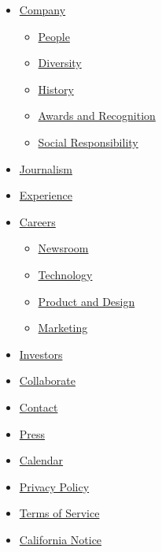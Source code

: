 \begin{itemize}
\tightlist
\item
  \href{https://www.nytco.com/company/}{Company}

  \begin{itemize}
  \tightlist
  \item
    \href{https://www.nytco.com/company/people/}{People}
  \item
    \href{https://www.nytco.com/company/diversity-and-inclusion/}{Diversity}
  \item
    \href{https://www.nytco.com/company/history/}{History}
  \item
    \href{https://www.nytco.com/company/prizes-awards/}{Awards and
    Recognition}
  \item
    \href{https://www.nytco.com/social-responsibility/}{Social
    Responsibility}
  \end{itemize}
\item
  \href{https://www.nytco.com/journalism/}{Journalism}
\item
  \href{https://www.nytco.com/experience-the-times/}{Experience}
\item
  \href{https://www.nytco.com/careers/}{Careers}

  \begin{itemize}
  \tightlist
  \item
    \href{https://www.nytco.com/careers/newsroom/}{Newsroom}
  \item
    \href{https://www.nytco.com/careers/technology/}{Technology}
  \item
    \href{https://www.nytco.com/careers/product-and-design/}{Product and
    Design}
  \item
    \href{https://www.nytco.com/careers/marketing/}{Marketing}
  \end{itemize}
\end{itemize}

\begin{itemize}
\tightlist
\item
  \href{http://www.nytco.com/investors/investor-relations/}{Investors}
\item
  \href{https://www.nytco.com/collaborate/}{Collaborate}
\item
  \href{https://www.nytco.com/contact/}{Contact}
\item
  \href{https://www.nytco.com/press/}{Press}
\item
  \href{https://www.nytco.com/events/}{Calendar}
\item
  \href{https://help.nytimes.com/hc/en-us/articles/115014892108-Privacy-policy}{Privacy
  Policy}
\item
  \href{https://help.nytimes.com/hc/en-us/articles/115014893428-Terms-of-service}{Terms
  of Service}
\item
  \href{http://www.nytimes.com/privacy/california-notice}{California
  Notice}
\end{itemize}

